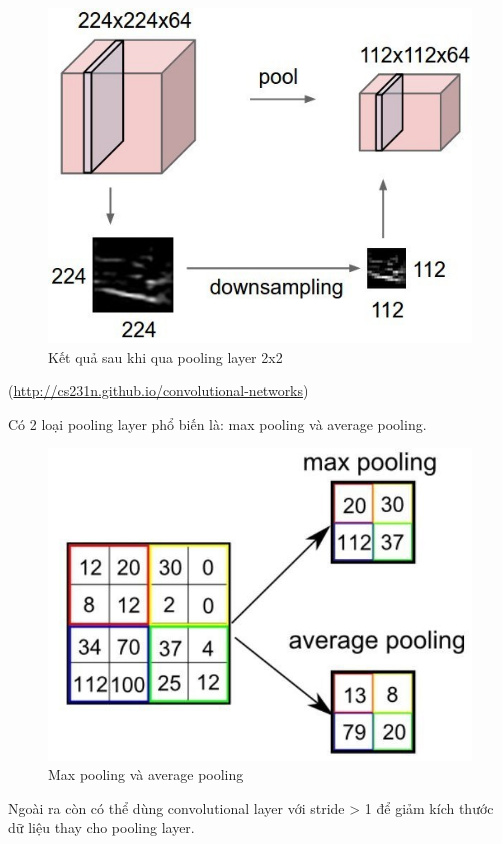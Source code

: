 \FloatBarrier
\begin{figure}[htp]
\begin{center}
\includegraphics[scale=0.5]{chap2/c2_figs/pooling.jpeg}
\end{center}
\caption{Kết quả sau khi qua pooling layer 2x2}
\label{fig:pooling}
\end{figure}
\FloatBarrier
\centerline{(\url{http://cs231n.github.io/convolutional-networks})}

Có 2 loại pooling layer phổ biến là: max pooling và average pooling.
\FloatBarrier
\begin{figure}[htp]
\begin{center}
\includegraphics[scale=0.5]{chap2/c2_figs/10.jpg}
\end{center}
\caption{Max pooling và average pooling}
\label{fig:pooling}
\end{figure}
\FloatBarrier
Ngoài ra còn có thể dùng convolutional layer với stride > 1 để giảm kích thước dữ liệu thay cho pooling layer.

